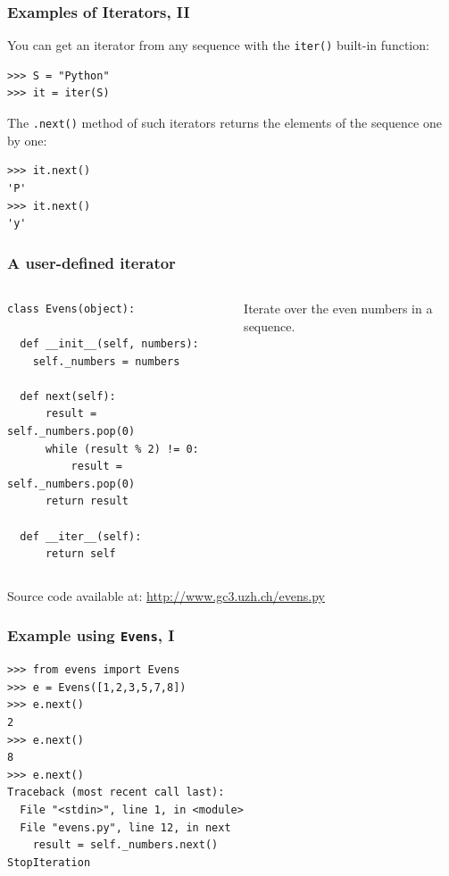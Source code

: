 \documentclass[english,serif,mathserif,xcolor=pdftex,dvipsnames,table]{beamer}
\begin{document}
\begin{frame}[fragile]
  \frametitle{Examples of Iterators, II}

  You can get an iterator from any sequence with the \texttt{iter()} built-in function:
\begin{lstlisting}
>>> S = "Python"
>>> it = iter(S)
\end{lstlisting}

  \+
  The \texttt{.next()} method of such iterators returns the
  elements of the sequence one by one:
\begin{lstlisting}
>>> it.next()
'P'
>>> it.next()
'y'
\end{lstlisting}
\end{frame}


\begin{frame}[fragile]
  \frametitle{A user-defined iterator}
  \begin{columns}[t]
    \begin{column}{0.5\textwidth}
\begin{lstlisting}
class Evens(object):

  def __init__(self, numbers):
    self._numbers = numbers

  def next(self):
      result = self._numbers.pop(0)
      while (result % 2) != 0:
          result = self._numbers.pop(0)
      return result

  def __iter__(self):
      return self
\end{lstlisting}
    \end{column}
    \begin{column}{0.5\textwidth}
      \raggedleft
      Iterate over the even numbers in a sequence.
    \end{column}
  \end{columns}

  \+
  {\scriptsize Source code available at:
    \url{http://www.gc3.uzh.ch/evens.py}}
\end{frame}


\begin{frame}[fragile]
  \frametitle{Example using \texttt{Evens}, I}
\begin{lstlisting}
>>> from evens import Evens
>>> e = Evens([1,2,3,5,7,8])
>>> e.next()
2
>>> e.next()
8
>>> e.next()
Traceback (most recent call last):
  File "<stdin>", line 1, in <module>
  File "evens.py", line 12, in next
    result = self._numbers.next()
StopIteration
\end{lstlisting}
\end{frame}
\end{document}
